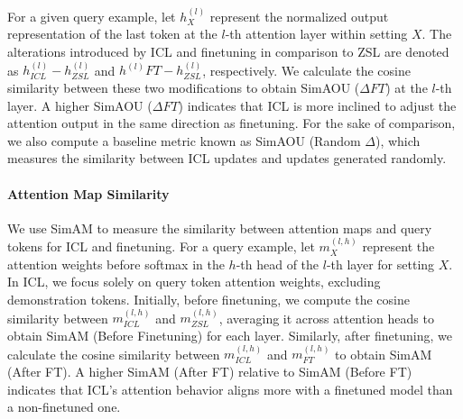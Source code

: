 For a given query example, let $h^{(l)}_X$ represent the normalized output representation of the last token at the $l$-th attention layer within setting $X$. The alterations introduced by ICL and finetuning in comparison to ZSL are denoted as $h^{(l)}_{ICL} - h^{(l)}_{ZSL}$ and $h^{(l)}{FT} - h^{(l)}_{ZSL}$, respectively. We calculate the cosine similarity between these two modifications to obtain SimAOU ($\Delta FT$) at the $l$-th layer. A higher SimAOU ($\Delta FT$) indicates that ICL is more inclined to adjust the attention output in the same direction as finetuning.
For the sake of comparison, we also compute a baseline metric known as SimAOU (Random $\Delta$), which measures the similarity between ICL updates and updates generated randomly.

\paragraph{Attention Map Similarity}
We use SimAM to measure the similarity between attention maps and query tokens for ICL and finetuning.
For a query example, let $m^{(l,h)}_X$ represent the attention weights before softmax in the $h$-th head of the $l$-th layer for setting $X$. In ICL, we focus solely on query token attention weights, excluding demonstration tokens. Initially, before finetuning, we compute the cosine similarity between $m^{(l,h)}_{ICL}$ and $m^{(l,h)}_{ZSL}$, averaging it across attention heads to obtain SimAM (Before Finetuning) for each layer.
Similarly, after finetuning, we calculate the cosine similarity between $m^{(l,h)}_{ICL}$ and $m^{(l,h)}_{FT}$ to obtain SimAM (After FT). A higher SimAM (After FT) relative to SimAM (Before FT) indicates that ICL's attention behavior aligns more with a finetuned model than a non-finetuned one.